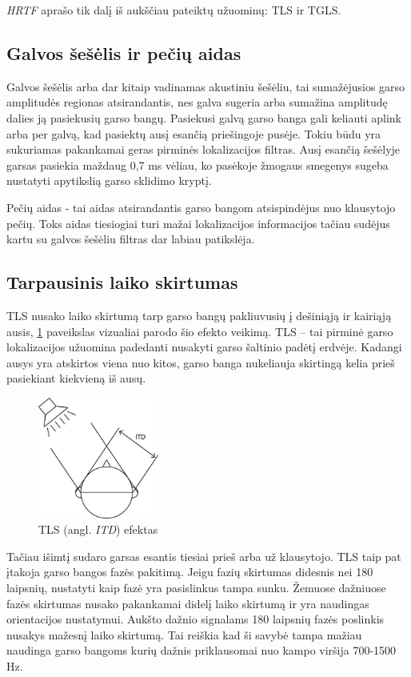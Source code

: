 \documentclass[]{vgtuef}
\begin{document}
\textit{HRTF} aprašo tik dalį iš aukščiau pateiktų užuominų: TLS ir TGLS.


\subsection{Galvos šešėlis ir pečių aidas}

Galvos šešėlis arba dar kitaip vadinamas akustiniu šešėliu, tai sumažėjusios garso amplitudės regionas atsirandantis, nes galva sugeria arba sumažina amplitudę dalies ją pasiekusių garso bangų. Pasiekusi galvą garso banga gali keliauti aplink arba per galvą, kad pasiektų ausį esančią priešingoje pusėje. Tokiu būdu yra sukuriamas pakankamai geras pirminės lokalizacijos filtras. Ausį esančią šešėlyje garsas pasiekia maždaug 0,7 ms vėliau, ko pasėkoje žmogaus smegenys sugeba nustatyti apytikslią garso sklidimo kryptį. 

Pečių aidas - tai aidas atsirandantis garso bangom atsispindėjus nuo klausytojo pečių. Toks aidas tiesiogiai turi mažai lokalizacijos informacijos tačiau sudėjus kartu su galvos šešėliu filtras dar labiau patikslėja.


\subsection{Tarpausinis laiko skirtumas}

TLS nusako laiko skirtumą tarp garso bangų pakliuvusių į dešiniąją ir kairiąją ausis, \ref{fig:ITD_1} paveikslas vizualiai parodo šio efekto veikimą. TLS – tai pirminė garso lokalizacijos užuomina padedanti nusakyti garso šaltinio padėtį erdvėje. Kadangi ausys yra atskirtos viena nuo kitos, garso banga nukeliauja skirtingą kelia prieš pasiekiant kiekvieną iš ausų.

\begin{figure}[!ht]
  \centering
  \includegraphics[width=150px]{img/ITD.jpg}
  \caption{TLS (angl. \textit{ITD}) efektas}
  \label{fig:ITD_1}
\end{figure}

Tačiau išimtį sudaro garsas esantis tiesiai prieš arba už klausytojo. TLS taip pat įtakoja garso bangos fazės  pakitimą. Jeigu fazių skirtumas didesnis nei 180 laipsnių, nustatyti kaip fazė yra pasislinkus tampa sunku. Žemuose dažniuose fazės skirtumas nusako pakankamai didelį laiko skirtumą ir yra naudingas orientacijos nustatymui. Aukšto dažnio signalams 180 laipsnių fazės poslinkis  nusakys mažesnį laiko skirtumą. Tai reiškia kad ši savybė tampa mažiau naudinga garso bangoms kurių dažnis priklausomai nuo kampo viršija 700-1500 Hz.
\end{document}
